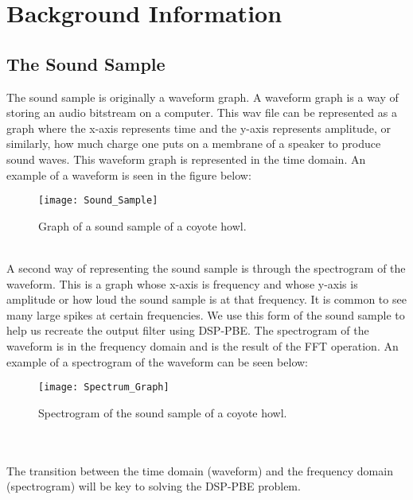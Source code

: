 \documentclass[english, 11pt]{article}
\begin{document}
\begin{comment} 
Currently, Ruzica Piskac and her team have a DSP-PBE Synthesizer that works on commutative sound samples. The distance calculation they used will remain constant for the terms of my project. My task is to figure out how to apply their work to non-commutative sound samples by altering/designing the search algorithm used.
\end{comment}

\section{Background Information}

\subsection{The Sound Sample}

The sound sample is originally a waveform graph. A waveform graph is a way of storing an audio bitstream on a computer. This wav file can be represented as a graph where the x-axis represents time and the y-axis represents amplitude, or similarly, how much charge one puts on a membrane of a speaker to produce sound waves. This waveform graph is represented in the time domain. An example of a waveform is seen in the figure below:
\begin{figure}[!htb]
\texttt{[image: Sound\_Sample]} 
\caption{Graph of a sound sample of a coyote howl.}\label{fig:image4}
\end{figure} \\
A second way of representing the sound sample is through the spectrogram of the waveform. This is a graph whose x-axis is frequency and whose y-axis is amplitude or how loud the sound sample is at that frequency. It is common to see many large spikes at certain frequencies. We use this form of the sound sample to help us recreate the output filter using DSP-PBE. The spectrogram of the waveform is in the frequency domain and is the result of the FFT operation. An example of a spectrogram of the waveform can be seen below:
\begin{figure}[!htb]
\centerline{\texttt{[image: Spectrum\_Graph]}} 
\caption{Spectrogram of the sound sample of a coyote howl.}\label{fig:image5}
\end{figure}\\ \\
The transition between the time domain (waveform) and the frequency domain (spectrogram) will be key to solving the DSP-PBE problem.
\end{document}
